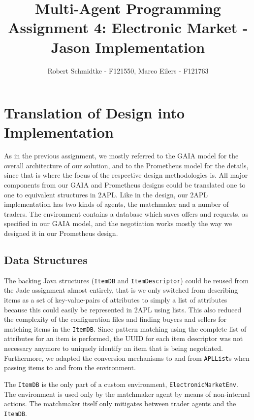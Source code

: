 \documentclass[a4paper,11pt]{article}
\begin{document}
\title{Multi-Agent Programming\\Assignment 4: Electronic Market - Jason Implementation}
\author{Robert Schmidtke - F121550, Marco Eilers - F121763}

\maketitle
\newpage

\section{Translation of Design into Implementation}
As in the previous assignment, we mostly referred to the GAIA model for the overall architecture of our solution, and to the Prometheus model for the details, since that is where the focus of the respective design methodologies is. All major components from our GAIA and Prometheus designs could be translated one to one to equivalent structures in 2APL. Like in the design, our 2APL implementation has two kinds of agents, the matchmaker and a number of traders. The environment contains a database which saves offers and requests, as specified in our GAIA model, and the negotiation works mostly the way we designed it in our Prometheus design.

\subsection{Data Structures}
The backing Java structures (\texttt{ItemDB} and \texttt{ItemDescriptor}) could be reused from the Jade assignment almost entirely, that is we only switched from describing items as a set of key-value-pairs of attributes to simply a list of attributes because this could easily be represented in 2APL using lists. This also reduced the complexity of the configuration files and finding buyers and sellers for matching items in the \texttt{ItemDB}. Since pattern matching using the complete list of attributes for an item is performed, the UUID for each item descriptor was not necessary anymore to uniquely identify an item that is being negotiated. Furthermore, we adapted the conversion mechanisms to and from \texttt{APLList}s when passing items to and from the environment.

The \texttt{ItemDB} is the only part of a custom environment, \texttt{ElectronicMarketEnv}. The environment is used only by the matchmaker agent by means of non-internal actions. The matchmaker itself only mitigates between trader agents and the \texttt{ItemDB}.
\end{document}
